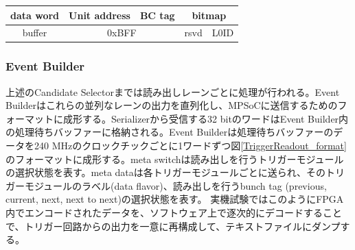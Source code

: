 \begin{table}
{\begin{tabular}{|c|cccccccccccccccccccccccccccccccc|}
        data word & \multicolumn{6}{c|}{Unit address}                                                                                                                         & \multicolumn{2}{c|}{BC tag}                       & \multicolumn{24}{c|}{bitmap}                                                                                                                                                                                                                                                                                                                                                                                                                                                                                                                                                                                   \\ \hline
        buffer    & \multicolumn{12}{c|}{0xBFF}                                                                                                                                                                                                                                                                                           & \multicolumn{9}{c|}{rsvd}                                                                                                                                                                                                               & \multicolumn{11}{c|}{L0ID}                                                                                                                                                                                                                                   \\ \hline
        \end{tabular}
        }
    \end{table}

    \subsubsection*{Event Builder}
    上述のCandidate Selectorまでは読み出しレーンごとに処理が行われる。Event Builderはこれらの並列なレーンの出力を直列化し、MPSoCに送信するためのフォーマットに成形する。Serializerから受信する32 bitのワードはEvent Builder内の処理待ちバッファーに格納される。Event Builderは処理待ちバッファーのデータを240 MHzのクロックチックごとに1ワードずつ図\ref{TriggerReadout_format}のフォーマットに成形する。meta switchは読み出しを行うトリガーモジュールの選択状態を表す。meta dataは各トリガーモジュールごとに送られ、そのトリガーモジュールのラベル(data flavor)、読み出しを行うbunch tag (previous, current, next, next to next)の選択状態を表す。
    実機試験ではこのようにFPGA内でエンコードされたデータを、ソフトウェア上で逐次的にデコードすることで、トリガー回路からの出力を一意に再構成して、テキストファイルにダンプする。

